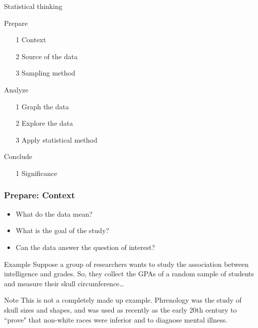 \documentclass[xcolor=table]{beamer}
\begin{document}
\begin{frame}{Statistical thinking}

\begin{block}{Prepare}
\begin{itemize}
\item [1] Context
\item [2] Source of the data
\item [3] Sampling method
\end{itemize}
\end{block}

\begin{block}{Analyze}
\begin{itemize}
\item [1] Graph the data
\item [2] Explore the data
\item [3] Apply statistical method
\end{itemize}
\end{block}

\begin{block}{Conclude}
\begin{itemize}
\item [1] Significance
\end{itemize}
\end{block}

\end{frame}

\begin{frame}
\frametitle{Prepare: Context}
\begin{block}{}
\begin{itemize}
\item What do the data mean?
\item What is the goal of the study?
\item Can the data answer the question of interest?
\end{itemize}
\end{block}

\pause
\begin{exampleblock}{Example}
Suppose a group of researchers wants to study the association between intelligence and grades. So, they collect the GPAs of a random sample of students and measure their skull circumference\ldots\\
\end{exampleblock}
\pause
\begin{alertblock}{Note}
This is not a completely made up example. Phrenology was the study of skull sizes and shapes, and was used as recently as the early 20th century to ``prove" that non-white races were inferior and to diagnose mental illness.
\end{alertblock}
\end{frame}
\end{document}
